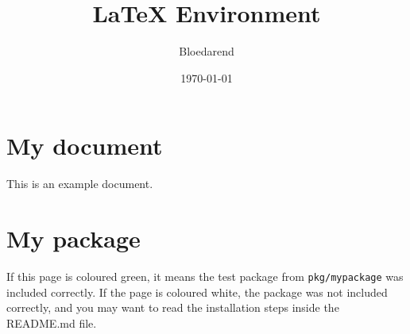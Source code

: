 \documentclass{article}
\title{LaTeX Environment}
\author{Bloedarend}
\date{\today}
\begin{document}
    \maketitle

    \begin{center}
    	\section{My document}\label{sec:my-document}
    	This is an example document.

        

    	\section{My package}\label{sec:my-package}
    	If this page is coloured green, it means the test package from \texttt{pkg/mypackage} was included correctly.
    	If the page is coloured white, the package was not included correctly, and you may want to read the installation steps inside the README.md file.
    \end{center}
\end{document}
